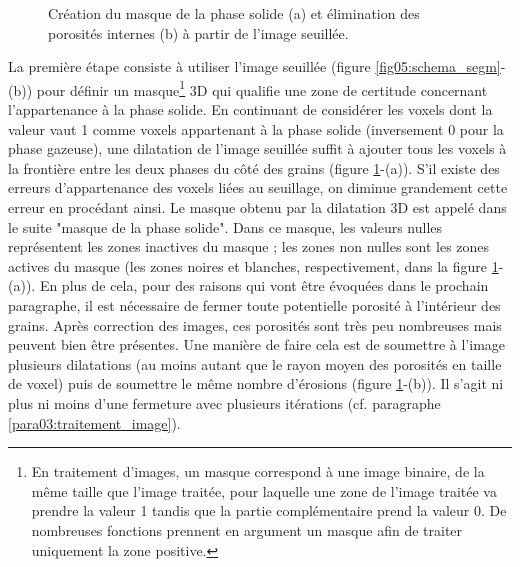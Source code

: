 \begin{figure}
{
			}
			\caption{\label{fig05:imProc_preTraitement}Création du masque de la phase solide (a) et élimination des porosités internes (b) à partir de l'image seuillée.}
		\end{figure}
		La première étape consiste à utiliser l'image seuillée (figure \ref{fig05:schema_segm}-(b)) pour définir un masque\footnote{En traitement d'images, un masque correspond à une image binaire, de la même taille que l'image traitée, pour laquelle une zone de l'image traitée va prendre la valeur \num{1} tandis que la partie complémentaire prend la valeur \num{0}. De nombreuses fonctions prennent en argument un masque afin de traiter uniquement la zone positive.} 3D qui qualifie une zone de certitude concernant l'appartenance à la phase solide. En continuant de considérer les voxels dont la valeur vaut \num{1}  comme voxels appartenant à la phase solide (inversement \num{0} pour la phase gazeuse), une dilatation de l'image seuillée suffit à ajouter tous les voxels à la frontière entre les deux phases du côté des grains (figure \ref{fig05:imProc_preTraitement}-(a)). S'il existe des erreurs d'appartenance des voxels liées au seuillage, on diminue grandement cette erreur en procédant ainsi. Le masque obtenu par la dilatation 3D est appelé dans le suite "masque de la phase solide". Dans ce masque, les valeurs nulles représentent les zones inactives du masque ; les zones non nulles sont les zones actives du masque (les zones noires et blanches, respectivement, dans la figure \ref{fig05:imProc_preTraitement}-(a)). En plus de cela, pour des raisons qui vont être évoquées dans le prochain paragraphe, il est nécessaire de fermer toute potentielle porosité à l'intérieur des grains. Après correction des images, ces porosités sont très peu nombreuses mais peuvent bien être présentes. Une manière de faire cela est de soumettre à l'image plusieurs dilatations (au moins autant que le rayon moyen des porosités en taille de voxel) puis de soumettre le même nombre d'érosions (figure \ref{fig05:imProc_preTraitement}-(b)). Il s'agit ni plus ni moins d'une fermeture avec plusieurs itérations (cf. paragraphe \ref{para03:traitement_image}).
